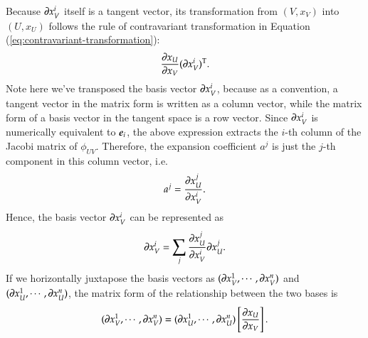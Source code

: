 \documentclass[11pt, a4paper]{book}
\begin{document}
Because $\boldsymbol{\partial}x_V^i$ itself is a tangent vector, its transformation from $(V,x_V)$
into $(U,x_U)$ follows the rule of contravariant transformation in Equation
(\ref{eq:contravariant-transformation}):
\begin{equation*}
  \frac{\partial x_U}{\partial x_V} (\boldsymbol{\partial}x_V^i)^{\mathrm{T}}.
\end{equation*}
Note here we've transposed the basis vector $\boldsymbol{\partial}x_V^i$, because as a convention,
a tangent vector in the matrix form is written as a column vector, while the matrix form
of a basis vector in the tangent space is a row vector. Since $\boldsymbol{\partial}x_V^i$ is
numerically equivalent to $\boldsymbol{e}_i$, the above expression extracts the $i$-th column of
the Jacobi matrix of $\phi_{UV}$. Therefore, the expansion coefficient $a^{j}$ is just the
$j$-th component in this column vector, i.e.
\begin{equation}
  a^j = \frac{\partial x_U^j}{\partial x_V^i}.
\end{equation}
Hence, the basis vector $\boldsymbol{\partial}x_V^i$ can be represented as
\begin{equation}
  \label{eq:tangent-vector-basis-relation}
  \boldsymbol{\partial}x_V^i = \sum_j \frac{\partial x_U^j}{\partial x_V^i} \boldsymbol{\partial}x_U^j.
\end{equation}
If we horizontally juxtapose the basis vectors as
$(\boldsymbol{\partial}x_V^1,\cdots,\boldsymbol{\partial}x_V^n)$ and
$(\boldsymbol{\partial}x_U^1,\cdots,\boldsymbol{\partial}x_U^n)$, the matrix form of the
relationship between the two bases is
\begin{equation}
  (\boldsymbol{\partial}x_V^1,\cdots,\boldsymbol{\partial}x_V^n) =
  (\boldsymbol{\partial}x_U^1,\cdots,\boldsymbol{\partial}x_U^n) \left[ \frac{\partial x_U}{\partial x_V} \right].
\end{equation}
\end{document}
